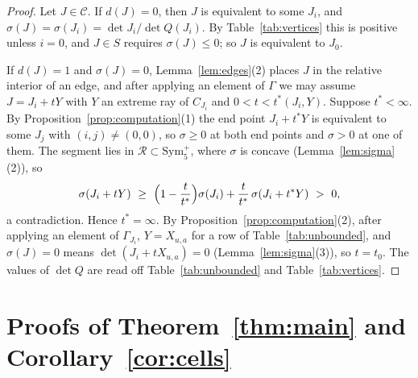 \documentclass[11pt]{amsart}
\theoremstyle{definition}
\theoremstyle{remark}
\numberwithin{equation}{section}
\numberwithin{table}{section}
\numberwithin{figure}{section}
\newcommand{\Rk}{\mathcal{R}}
\newcommand{\Sym}{\mathrm{Sym}}
\newcommand{\cand}{\mathcal{C}}
\begin{document}
\begin{proof}
Let $J\in\cand$. If $d(J)=0$, then $J$ is equivalent to some $J_i$, and $\sigma(J)=\sigma(J_i)=\det J_i/\det Q(J_i)$. By Table~\ref{tab:vertices} this is positive unless $i=0$, and $J\in S$ requires $\sigma(J)\le0$; so $J$ is equivalent to $J_0$.

If $d(J)=1$ and $\sigma(J)=0$, Lemma~\ref{lem:edges}(2) places $J$ in the relative interior of an edge, and after applying an element of $\Gamma$ we may assume $J=J_i+tY$ with $Y$ an extreme ray of $C_{J_i}$ and $0<t<t^*(J_i,Y)$. Suppose $t^*<\infty$. By Proposition~\ref{prop:computation}(1) the end point $J_i+t^*Y$ is equivalent to some $J_j$ with $(i,j)\ne(0,0)$, so $\sigma\ge0$ at both end points and $\sigma>0$ at one of them. The segment lies in $\Rk\subset\Sym_5^+$, where $\sigma$ is concave (Lemma~\ref{lem:sigma}(2)), so
\[
\sigma(J_i+tY)\ \ge\ \Bigl(1-\frac t{t^*}\Bigr)\sigma(J_i)+\frac t{t^*}\,\sigma(J_i+t^*Y)\ >\ 0,
\]
a contradiction. Hence $t^*=\infty$. By Proposition~\ref{prop:computation}(2), after applying an element of $\Gamma_{J_i}$, $Y=X_{u,a}$ for a row of Table~\ref{tab:unbounded}, and $\sigma(J)=0$ means $\det(J_i+tX_{u,a})=0$ (Lemma~\ref{lem:sigma}(3)), so $t=t_0$. The values of $\det Q$ are read off Table~\ref{tab:unbounded} and Table~\ref{tab:vertices}.
\end{proof}

\section{Proofs of Theorem~\ref{thm:main} and Corollary~\ref{cor:cells}}\label{sec:proofs}
\end{document}
